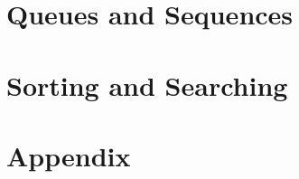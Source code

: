 \documentclass[a4paper,twoside]{book} %
\begin{document}





\part{Queues and Sequences}




\part{Sorting and Searching}




\part{Appendix}
\appendix
\appendixpage
\noappendicestocpagenum
\addappheadtotoc





\printindex
\end{document}
